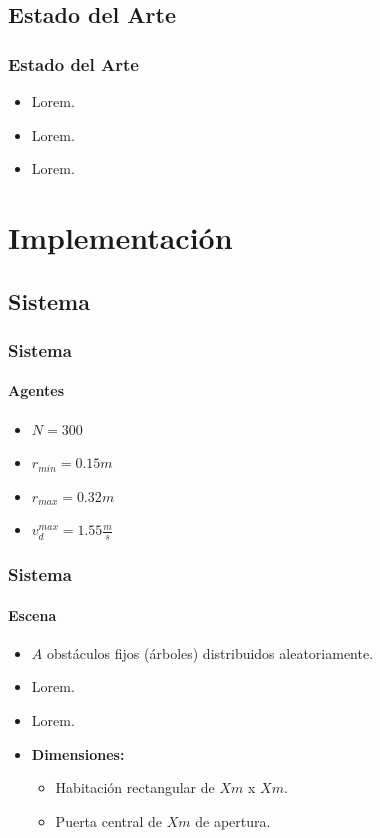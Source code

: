 \documentclass[hyperref={pdfpagelayout=SinglePage}]{beamer}
\begin{document}
\subsection{Estado del Arte}

\begin{frame}
\frametitle{Estado del Arte}
\begin{itemize}
	\item Lorem.
	\item Lorem.
	\item Lorem.
\end{itemize}
\end{frame}

\section{Implementación}

\subsection{Sistema}

\begin{frame}
\frametitle{Sistema}
\framesubtitle{Agentes}
\begin{itemize}
	\item $N = 300$
	\item $r_{min} = 0.15m$
	\item $r_{max} = 0.32m$
	\item $v_{d}^{max} = 1.55 \frac{m}{s}$
\end{itemize}
\end{frame}

\begin{frame}
\frametitle{Sistema}
\framesubtitle{Escena}
\begin{itemize}
	\item $A$ obstáculos fijos (árboles) distribuidos aleatoriamente.
	\item Lorem.
	\item Lorem.
	\item \textbf{Dimensiones:}
	\begin{itemize}
		\item Habitación rectangular de $Xm$ x $Xm$.
		\item Puerta central de $Xm$ de apertura.
	\end{itemize}
\end{itemize}
\end{frame}
\end{document}
